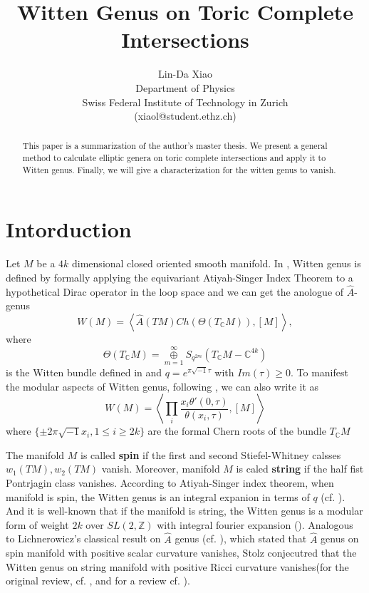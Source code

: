 \documentclass[11pt]{article}
\title{\bf Witten Genus on Toric Complete Intersections}
\author{Lin-Da Xiao %
\\Department of Physics\\
Swiss Federal Institute of Technology in Zurich\\
{\small(xiaol@student.ethz.ch)}}
\begin{document}
\maketitle
\begin{abstract}
\noindent
This paper is a summarization of the author's master thesis. We present a general method to calculate elliptic genera on toric complete intersections and apply it to Witten genus. Finally, we will give a characterization for the witten genus to vanish.
\end{abstract} 
\section{Intorduction}
Let $M$ be a $4k$ dimensional closed oriented smooth manifold. In \cite{witten1988index}, Witten genus is defined by formally applying the equivariant Atiyah-Singer Index Theorem to a hypothetical Dirac operator in the loop space and we can get the anologue of $\hat{A}$-genus
\begin{equation*}
	W(M)=\left\langle\hat{A}(TM) Ch(\Theta(T_\mathbb{C}M)),[M] \right\rangle,
\end{equation*}
where 
\begin{equation*}
	\Theta(T_{\mathbb{C}}M)=\underset{m=1}{\overset{\infty}{\oplus}} S_{q^{2m}}(T_{\mathbb{C}}M-\mathbb{C}^{4k})
\end{equation*}
is the Witten bundle defined in \cite{witten1988index} and $q=e^{\pi\sqrt{-1} \tau}$ with $Im(\tau)\geq 0$.
To manifest the modular aspects of Witten genus, following \cite{liu1996elliptic}, we can also write it as
\begin{equation*}
	W(M)=\left\langle\prod_{i}\frac{x_i \theta'(0,\tau)}{\theta(x_i,\tau)},[M]\right\rangle
\end{equation*}
where $\{\pm 2\pi\sqrt{-1}x_i,1\leq i\geq 2k\}$ are the formal Chern roots of the bundle $T_{\mathbb{C}}M$

The manifold $M$ is called \textbf{spin} if the first and second Stiefel-Whitney calsses $w_1(TM), w_2(TM)$ vanish. Moreover, manifold $M$ is caled \textbf{string} if the half fist Pontrjagin class vanishes. According to Atiyah-Singer index theorem, when manifold is spin, the Witten genus is an integral expanion in terms of $q$ (cf. \cite{hirzebruch1992manifolds}). And it is well-known that if the manifold is string, the Witten genus is a modular form of weight $2k$ over $SL(2,\mathbb{Z})$ with integral fourier expansion (\cite{zagier1988note}).
Analogous to Lichnerowicz's classical result on $\hat{A}$ genus (cf. \cite{lawson2016spin}), which stated that $\hat{A}$ genus on spin manifold with positive scalar curvature vanishes, Stolz conjecutred that the Witten genus on string manifold with positive Ricci curvature vanishes(for the original review, cf. \cite{stolz1996conjecture}, and for a review cf. \cite{dessai2009some}). 
\end{document}
